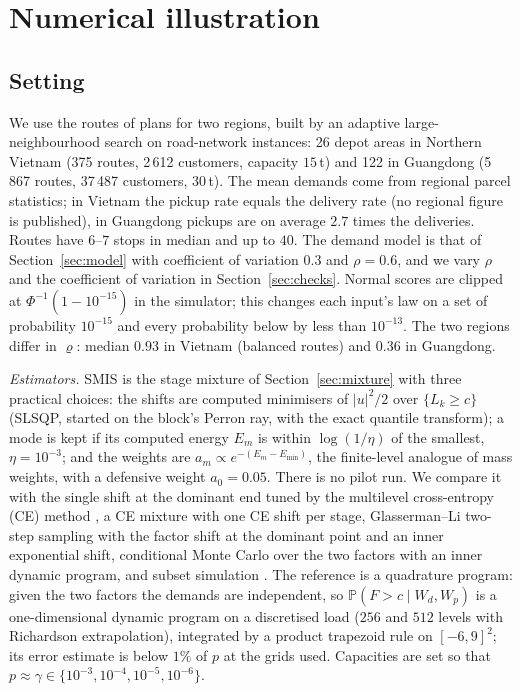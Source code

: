 \documentclass[11pt]{article}
\theoremstyle{definition}
\theoremstyle{remark}
\renewcommand{\P}{\mathbb{P}}
\begin{document}
\section{Numerical illustration}
\label{sec:numerics}

\subsection{Setting}
We use the routes of plans for two regions, built by an adaptive large-neighbourhood
search on road-network instances: 26 depot areas in Northern Vietnam (375 routes, 2\,612
customers, capacity $15$\,t) and 122 in Guangdong (5\,867 routes, 37\,487 customers,
$30$\,t). The mean demands come from regional parcel statistics; in Vietnam the pickup
rate equals the delivery rate (no regional figure is published), in Guangdong pickups
are on average $2.7$ times the deliveries. Routes have $6$--$7$ stops in median and up to
$40$. The demand model is that of Section~\ref{sec:model} with coefficient of variation
$0.3$ and $\rho=0.6$, and we vary $\rho$ and the coefficient of variation in
Section~\ref{sec:checks}. Normal scores are clipped at $\Phi^{-1}(1-10^{-15})$ in the
simulator; this changes each input's law on a set of probability $10^{-15}$ and every
probability below by less than $10^{-13}$. The two regions differ in $\varrho$:
median $0.93$ in Vietnam (balanced routes) and $0.36$ in Guangdong.

\emph{Estimators.} SMIS is the stage mixture of Section~\ref{sec:mixture} with three
practical choices: the shifts are computed minimisers of $|u|^2/2$ over $\{L_k\ge c\}$
(SLSQP, started on the block's Perron ray, with the exact quantile transform); a mode is
kept if its computed energy $E_m$ is within $\log(1/\eta)$ of the smallest,
$\eta=10^{-3}$; and the weights are $a_m\propto e^{-(E_m-E_{\min})}$, the finite-level
analogue of mass weights, with a defensive weight $a_0=0.05$. There is no pilot run. We
compare it with the single shift at the dominant end tuned by the multilevel
cross-entropy (CE) method \citep{deBoerEtAl2005}, a CE mixture with one CE shift per
stage, Glasserman--Li two-step sampling \citep{GlassermanLi2005} with the factor shift at
the dominant point and an inner exponential shift, conditional Monte Carlo over the two
factors with an inner dynamic program, and subset simulation \citep{AuBeck2001}. The
reference is a quadrature program: given the two factors the demands are independent,
so $\P(F>c\mid W_d,W_p)$ is a one-dimensional dynamic program on a discretised load
($256$ and $512$ levels with Richardson extrapolation), integrated by a product
trapezoid rule on $[-6,9]^2$; its error estimate is below $1\%$ of $p$ at the grids used.
Capacities are set so that $p\approx\gamma\in\{10^{-3},10^{-4},10^{-5},10^{-6}\}$.
\end{document}
